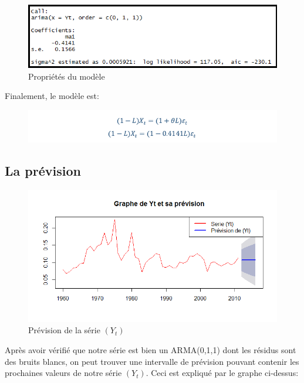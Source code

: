 \documentclass{article}
\begin{document}
\begin{figure}[h!]
\includegraphics[width=\linewidth]{images/Yt_coeff.png}
\caption{Propriétés du modèle}
\label{fig:Yt_coeff}
\end{figure}

Finalement, le modèle est:

\begin{figure}[h!]
\includegraphics[width=\linewidth]{images/Yt_arima.png}
\end{figure}

\subsection{La prévision}

\begin{figure}[h!]
\includegraphics[width=\linewidth]{images/Yt_prevision.png}
\caption{Prévision de la série $(Y_t)$}
\label{fig:Yt_prevision}
\end{figure}

Après avoir vérifié que notre série est bien un ARMA(0,1,1) dont les résidus sont des bruits blancs, on peut trouver une intervalle de prévision pouvant contenir les prochaines valeurs de notre série $(Y_t)$. Ceci est expliqué par le graphe ci-dessus:
\end{document}
